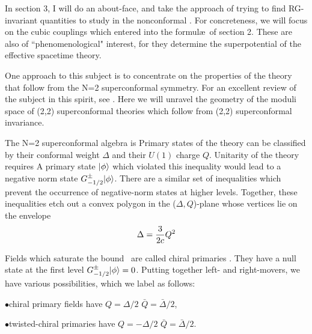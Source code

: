 In section 3, I will do an about-face, and take the approach of trying to
find RG-invariant quantities to study in the nonconformal \sm. For
concreteness, we will focus on the cubic couplings which entered into the
formul\ae\ of section 2. These are also of ``phenomenological" interest, for
they determine the superpotential of the effective spacetime theory.


One approach to this subject is to concentrate on the properties of the
theory that follow from the N=2 superconformal symmetry. For an excellent
review of the subject in this spirit, see \DixonRev. Here we will
unravel the geometry of the moduli space of (2,2) superconformal theories
which follow from (2,2) superconformal invariance.

The N=2 superconformal algebra is
\eqn{}
Primary states of the theory can be classified by their conformal weight
$\Delta$ and their $U(1)$ charge $Q$. Unitarity of the theory requires
\eqn{}
A primary state $| \phi \rangle$ which violated this inequality would lead to a
negative norm state $G^\pm_{-1/2}| \phi \rangle$. There are a similar set of
inequalities which prevent the occurrence of negative-norm states at higher
levels. Together, these inequalities etch out a convex polygon in the
($\Delta,Q$)-plane whose vertices lie on the envelope
$$\Delta= {3\over2c} Q^2$$

Fields which saturate the bound \untara\ are called chiral primaries \LVW.
They have a null state at the first level $G^\pm_{-1/2}| \phi \rangle=0$.
Putting together left- and right-movers, we have  various possibilities, which
we label as follows:
\item{$\bullet$}chiral primary fields have  $Q=  \Delta/2$ $\bar
Q=\bar\Delta/2$,
\item{$\bullet$}twisted-chiral primaries have $Q=-\Delta/2$
$\bar Q=\bar\Delta/2$.

